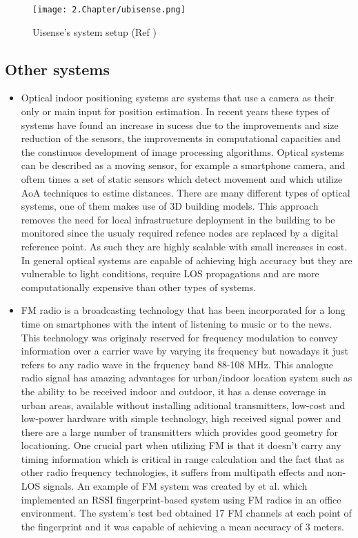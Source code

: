 \begin{figure}[H]
	\centering
		\texttt{[image: 2.Chapter/ubisense.png]}
	\caption[Uisense's system setup (Ref \cite{ubisense}) ]{Uisense's system setup (Ref \cite{ubisense})}
	\label{fig:ubisense}
\end{figure}


\subsection{Other systems}
\label{subsec:others}

\begin{itemize}

\item [] Optical indoor positioning systems are systems that use a camera as their only or main input for position estimation. In recent years these types of systems have found an increase in sucess due to the improvements and size reduction of the sensors, the improvements in computational capacities and the constinuos development of image processing algorithms. Optical systems can be described as a moving sensor, for example a smartphone camera, and oftem times a set of static sensors which detect movement and which utilize \ac{AoA} techniques to estime distances. There are many different types of optical systems, one of them makes use of 3D building models. This approach removes the need for local infrastructure deployment in the building to be monitored since the usualy required refence nodes are replaced by a digital reference point. As such they are highly scalable with small increases in cost.
In general optical systems are capable of achieving high accuracy but they are vulnerable to light conditions, require \ac{LOS} propagations and are more computationally expensive than other types of systems.


\item [] \ac{FM} radio is a broadcasting technology that has been incorporated for a long time on smartphones with the intent of listening to music or to the news. This technology was originaly reserved for frequency modulation to convey information over a carrier wave by varying its frequency but nowadays it just refers to any radio wave in the frquency band 88-108 MHz. This analogue radio signal has amazing advantages for urban/indoor location system such as the ability to be received indoor and outdoor, it has a dense coverage in urban areas, available without installing aditional transmitters, low-cost and low-power hardware with simple technology, high received signal power and there are a large number of transmitters which provides good geometry for locationing. One crucial part when utilizing \ac{FM} is that it doesn't carry any timing information which is critical in range calculation and the fact that as other radio frequency technologies, it suffers from  multipath effects and non-\ac{LOS} signals. An example of FM system was created by  et al. \cite{fm} which implemented an \ac{RSSI} fingerprint-based system using FM radios in an office environment. The system's test bed obtained 17 FM channels at each point of the fingerprint and it was capable of achieving a mean accuracy of 3 meters.



\end{itemize}
